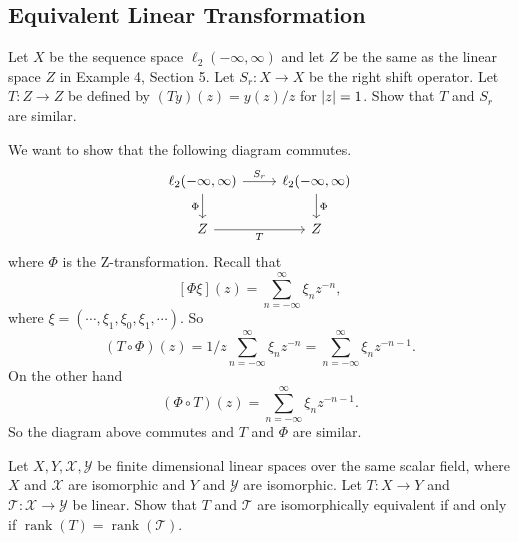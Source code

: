 \subsection{Equivalent Linear Transformation}
\begin{problem}
	Let $ X $ be the sequence space $ \ell_2(-\infty,\infty) $ and let $ Z $ be the same as the linear space $ Z $ in Example 4, Section 5. Let $ S_r: X\to X $ be the right shift operator. Let $ T:Z\to Z $ be defined by $ (Ty)(z) = y(z)/z $ for $ \left|z\right|=1 $. Show that $ T $ and $ S_r $ are similar.
\end{problem}
\begin{solution}
	We want to show that the following diagram commutes.
	\[\begin{tikzcd}
		{\ell_2(-\infty,\infty)} & {\ell_2(-\infty,\infty)} \\
		Z & Z
		\arrow["{S_r}", from=1-1, to=1-2]
		\arrow["\Phi"', from=1-1, to=2-1]
		\arrow["\Phi", from=1-2, to=2-2]
		\arrow["T"', from=2-1, to=2-2]
	\end{tikzcd}\]
	where $ \Phi $ is the Z-transformation. Recall that
	\[ [\Phi \xi](z) = \sum_{n=-\infty}^{\infty} \xi_n z^{-n}, \]
	where $ \xi = (\cdots,\xi_1,\xi_0,\xi_1,\cdots) $.
	So
	\[ (T\circ \Phi)(z) = 1/z \sum_{n=-\infty}^{\infty} \xi_n z^{-n} =  \sum_{n=-\infty}^{\infty} \xi_n z^{-n-1}. \]
	On the other hand 
	\[ (\Phi\circ T)(z) = \sum_{n=-\infty}^{\infty} \xi_n z^{-n-1}.  \]
	So the diagram above commutes and $ T $ and $ \Phi $ are similar.
\end{solution}

\begin{problem}
	Let $ X,Y, \mathcal{X},\mathcal{Y} $ be finite dimensional linear spaces over the same scalar field, where $ X $ and $ \mathcal{X} $ are isomorphic and $ Y $ and $ \mathcal{Y} $ are isomorphic. Let $ T:X\to Y $ and $ \mathcal{T}:\mathcal{X}\to\mathcal{Y} $ be linear. Show that $ T $ and $ \mathcal{T} $ are isomorphically equivalent if and only if $ \operatorname{rank}(T) = \operatorname{rank}(\mathcal{T}) $.
\end{problem}











